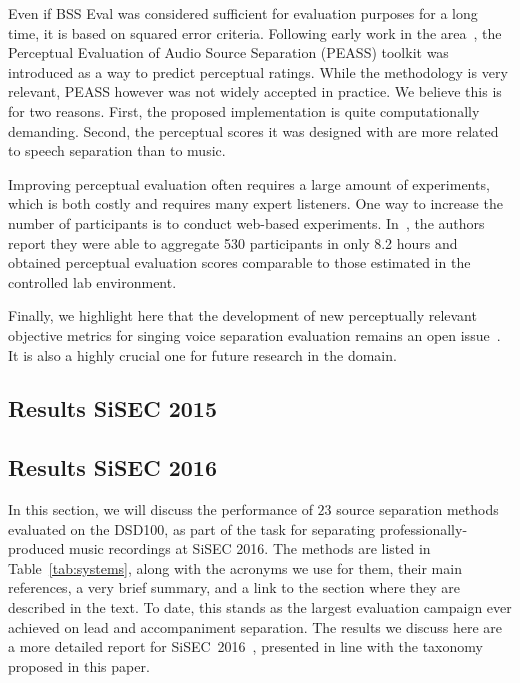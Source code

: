 Even if BSS Eval was considered sufficient for evaluation purposes for a long time, it is based on squared error criteria. Following early work in the area~\cite{kornycky08}, the Perceptual Evaluation of Audio Source Separation (PEASS) toolkit \cite{emiya10,emiya11,vincent122} was introduced as a way to predict perceptual ratings. While the methodology is very relevant, PEASS however was not widely accepted in practice. We believe this is for two reasons. First, the proposed implementation is quite computationally demanding. Second, the perceptual scores it was designed with are more related to speech separation than to music.

Improving perceptual evaluation often requires a large amount of experiments, which is both costly and requires many expert listeners. One way to increase the number of participants is to conduct web-based experiments. In~\cite{cartwright16}, the authors report they were able to aggregate 530 participants in only 8.2 hours and obtained perceptual evaluation scores comparable to those estimated in the controlled lab environment.

Finally, we highlight here that the development of new perceptually relevant objective metrics for singing voice separation evaluation remains an open issue~\cite{gupta15}. It is also a highly crucial one for future research in the domain.

\subsection{Results SiSEC 2015}
\label{ssec:performance}

\kant[1-16]

\subsection{Results SiSEC 2016}
\label{ssec:performance}

In this section, we will discuss the performance of $23$ source separation methods evaluated on the DSD100, as part of the task for separating professionally-produced music recordings at SiSEC 2016. The methods are listed in Table~\ref{tab:systems}, along with the acronyms we use for them, their main references, a very brief summary, and a link to the section where they are described in the text. To date, this stands as the largest evaluation campaign ever achieved on lead and accompaniment separation. The results we discuss here are a more detailed report for SiSEC~2016~\cite{liutkus17}, presented in line with the taxonomy proposed in this paper.

